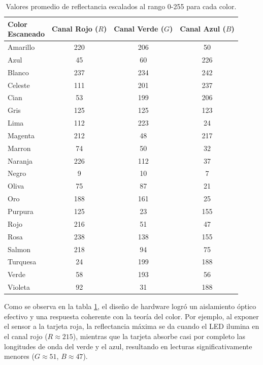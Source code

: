 \documentclass[conference]{IEEEtran}
\begin{document}
\begin{table}[htbp]
    \centering
    \caption{Valores promedio de reflectancia escalados al rango 0-255 para cada color.}
    \begin{tabular}{|l|c|c|c|}
        \hline
        \makecell{Color\\Escaneado} & 
        \makecell{Canal\\Rojo ($R$)} & 
        \makecell{Canal\\Verde ($G$)} & 
        \makecell{Canal\\Azul ($B$)}  \\
        \hline
        Amarillo   & 220 & 206 & 50  \\
        Azul       & 45  & 60  & 226 \\
        Blanco     & 237 & 234 & 242 \\
        Celeste    & 111 & 201 & 237 \\
        Cian       & 53  & 199 & 206 \\
        Gris       & 125 & 125 & 123 \\
        Lima       & 112 & 223 & 24  \\
        Magenta    & 212 & 48  & 217 \\
        Marron     & 74  & 50  & 32  \\
        Naranja    & 226 & 112 & 37  \\
        Negro      & 9   & 10  & 7   \\
        Oliva      & 75  & 87  & 21  \\
        Oro        & 188 & 161 & 25  \\
        Purpura    & 125 & 23  & 155 \\
        Rojo       & 216 & 51  & 47  \\
        Rosa       & 238 & 138 & 155 \\
        Salmon     & 218 & 94  & 75  \\
        Turquesa   & 24  & 199 & 188 \\
        Verde      & 58  & 193 & 56  \\
        Violeta    & 92  & 31  & 188 \\
        \hline
    \end{tabular}
    \label{tab:promedios_color}
\end{table}



Como se observa en la tabla \ref{tab:promedios_color}, el diseño de hardware logró un aislamiento óptico efectivo y una respuesta coherente con la teoría del color. Por ejemplo, al exponer el sensor a la tarjeta roja, la reflectancia máxima se da cuando el LED ilumina en el canal rojo ($R \approx 215$), mientras que la tarjeta absorbe casi por completo las longitudes de onda del verde y el azul, resultando en lecturas significativamente menores ($G \approx 51$, $B \approx 47$). 
\end{document}
